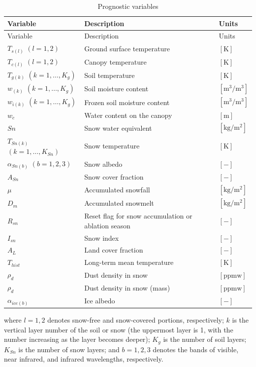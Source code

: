 \begin{longtable}[]{@{}lll@{}}
\caption{Prognostic variables}\tabularnewline
\toprule
Variable & Description & Units \\
\midrule
\endfirsthead
\toprule
Variable & Description & Units \\
\midrule
\endhead
\(T_{s(l)}\) \((l=1,2)\) & Ground surface temperature & \(\mathrm{[K]}\) \\
\(T_{c(l)}\) \((l=1,2)\) & Canopy temperature & \(\mathrm{[K]}\) \\
\(T_{g(k)}\) \((k=1,\ldots,K_g)\) & Soil temperature & \(\mathrm{[K]}\) \\
\(w_{(k)}\) \((k=1,\ldots,K_g)\) & Soil moisture content & \(\mathrm{[m^3/m^3]}\) \\
\(w_{i(k)}\) \((k=1,\ldots,K_g)\) & Frozen soil moisture content & \(\mathrm{[m^3/m^3]}\) \\
\(w_c\) & Water content on the canopy & \(\mathrm{[m]}\) \\
\(Sn\) & Snow water equivalent & \(\mathrm{[kg/m^2]}\) \\
\(T_{Sn(k)}\) \((k=1,\ldots,K_{Sn})\) & Snow temperature & \(\mathrm{[K]}\) \\
\(\alpha_{Sn(b)}\) \((b=1,2,3)\) & Snow albedo & \(\mathrm{[-]}\) \\
\(A_{Sn}\) & Snow cover fraction & \(\mathrm{[-]}\) \\
\(\mu\) & Accumulated snowfall & \(\mathrm{[kg/m^2]}\) \\
\(D_m\) & Accumulated snowmelt & \(\mathrm{[kg/m^2]}\) \\
\(R_{sn}\) & Reset flag for snow accumulation or ablation season & \(\mathrm{[-]}\) \\
\(I_{sn}\) & Snow index & \(\mathrm{[-]}\) \\
\(A_{L}\) & Land cover fraction & \(\mathrm{[-]}\) \\
\(T_{hist}\) & Long-term mean temperature & \(\mathrm{[K]}\) \\
\(\rho_d\) & Dust density in snow & \(\mathrm{[ppmw]}\) \\
\(\rho_d\) & Dust density in snow (mass) & \(\mathrm{[ppmw]}\) \\
\(\alpha_{ice(b)}\) & Ice albedo & \(\mathrm{[-]}\) \\
\bottomrule
\end{longtable}

where \(l=1,2\) denotes snow-free and snow-covered portions, respectively; \(k\) is the vertical layer number of the soil or snow (the uppermost layer is 1, with the number increasing as the layer
becomes deeper); \(K_g\) is the number of soil layers; \(K_{Sn}\) is the number of snow layers; and \(b=1,2,3\) denotes the bands of visible, near infrared, and infrared wavelengths, respectively.

